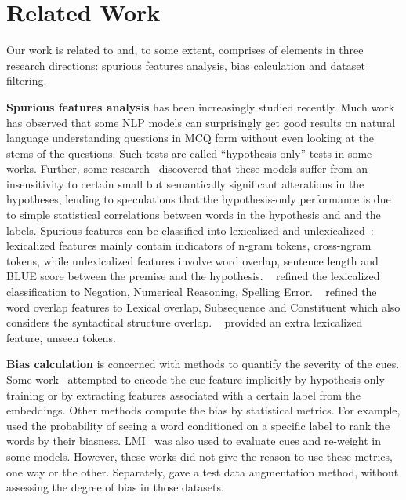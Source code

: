 \section{Related Work}
\label{sec:related}

Our work is related to and, to some extent, comprises of 
elements in three research directions: spurious features analysis, 
bias calculation and dataset filtering. 
 
\textbf{Spurious features analysis} has been increasingly studied recently. 
Much work~\cite{sharma2018tackling,srinivasan2018simple,zellers2018swag} 
has observed that some NLP models can surprisingly 
get good results on natural language understanding questions in MCQ form without 
even looking at the stems of the questions. Such tests are called
``hypothesis-only'' tests in some works.
Further, some research~\cite{sanchez2018behavior} discovered that these models 
suffer from an insensitivity to certain small but semantically significant alterations
in the hypotheses, lending to speculations that the hypothesis-only performance
is due to simple statistical correlations between words in the hypothesis and 
and the labels. 
Spurious features can be classified into
lexicalized and unlexicalized~\cite{bowman2015large}:
lexicalized features mainly contain indicators of n-gram tokens, cross-ngram tokens, 
while unlexicalized features involve word overlap, sentence length and BLUE score between 
the premise and the hypothesis. ~\citealp{naik2018stress} refined the 
lexicalized classification to Negation, Numerical Reasoning, 
Spelling Error. ~\citealp{mccoy2019right} refined the word overlap 
features to Lexical overlap, Subsequence and Constituent 
which also considers the syntactical structure overlap. ~\citealp{sanchez2018behavior} 
provided an extra lexicalized feature, unseen tokens. 

\textbf{Bias calculation} is concerned with methods to quantify the severity of the cues. 
Some work~\cite{clark2019don,he2019unlearn,yaghoobzadeh2019robust} 
attempted to encode the cue feature implicitly by 
hypothesis-only training or by extracting features associated with a certain label 
from the embeddings. 
Other methods compute the bias by statistical metrics. 
For example, \citealp{yu2020reclor} used the probability of seeing a word 
conditioned on a specific label to rank the words by their biasness. 
LMI~\cite{schuster2019towards} was also used to evaluate cues and 
re-weight in some models. 
However, these works did not give the reason to use these metrics, one way or 
the other.
Separately, \citealp{Marco2020acl} gave a test data augmentation method, 
without assessing the degree of bias in those datasets.


